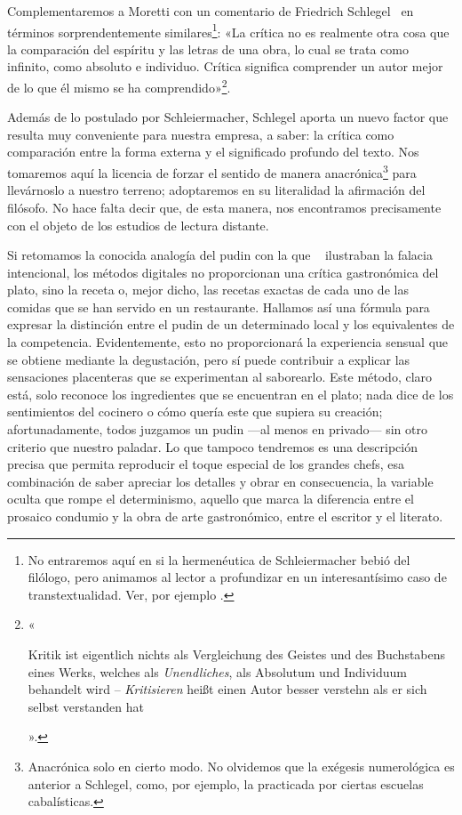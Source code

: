 Complementaremos a Moretti con un comentario de Friedrich Schlegel~\parencite*[p. 107; traducción propia]{schlegel1957} en términos sorprendentemente similares\footnote{
	No entraremos aquí en si la hermenéutica de Schleiermacher bebió del filólogo, pero animamos al lector a profundizar en un interesantísimo caso de transtextualidad. Ver, por ejemplo \cite[p. 436 nn. 13-15]{patsch1966}.
}: «La crítica no es realmente otra cosa que la comparación del espíritu y las letras de una obra, lo cual se trata como infinito, como absoluto e individuo. Crítica significa comprender un autor mejor de lo que él mismo se ha comprendido»\footnote{
	«\begin{textgerman}Kritik ist eigentlich nichts als Vergleichung des Geistes und des Buchstabens eines Werks, welches als \textit{Unendliches}, als Absolutum und Individuum behandelt wird – \textit{Kritisieren} heißt einen Autor besser verstehn als er sich selbst verstanden hat\end{textgerman}».
}.

Además de lo postulado por Schleiermacher, Schlegel aporta un nuevo factor que resulta muy conveniente para nuestra empresa, a saber: la crítica como comparación entre la forma externa y el significado profundo del texto. Nos tomaremos aquí la licencia de forzar el sentido de manera anacrónica\footnote{Anacrónica solo en cierto modo. No olvidemos que la exégesis numerológica es anterior a Schlegel, como, por ejemplo, la practicada por ciertas escuelas cabalísticas.} para llevárnoslo a nuestro terreno; adoptaremos en su literalidad la afirmación  del filósofo. No hace falta decir que, de esta manera, nos encontramos precisamente con el objeto de los estudios de lectura distante.

Si retomamos la conocida analogía del pudin con la que  \citeauthor{wimsatt1954}~\parencite*[4-5]{wimsatt1954} ilustraban la falacia intencional, los métodos digitales no proporcionan una crítica gastronómica del plato, sino la receta o, mejor dicho, las recetas exactas de cada uno de las comidas que se han servido en un restaurante. Hallamos así una fórmula para expresar la distinción entre el pudin de un determinado local y los equivalentes de la competencia. Evidentemente, esto no proporcionará la experiencia sensual que se obtiene mediante la degustación, pero sí puede contribuir a explicar las sensaciones placenteras que se experimentan al saborearlo. Este método, claro está, solo reconoce los ingredientes que se encuentran en el plato; nada dice de los sentimientos del cocinero o cómo quería este que supiera su creación; afortunadamente, todos juzgamos un pudin —al menos en privado— sin otro criterio que nuestro paladar. Lo que tampoco tendremos es una descripción precisa que permita reproducir el toque especial de los grandes chefs, esa combinación de saber apreciar los detalles y obrar en consecuencia, la variable oculta que rompe el determinismo, aquello que marca la diferencia entre el prosaico condumio y la obra de arte gastronómico, entre el escritor y el literato.

